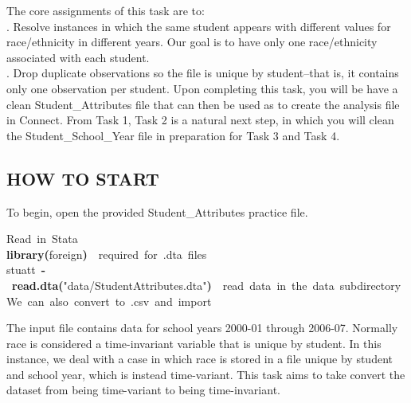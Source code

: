 \documentclass[12pt]{article}
\makeatletter
\newcommand{\hlfunctioncall}[1]{\textcolor[rgb]{0.501960784313725,0,0.329411764705882}{\textbf{#1}}}%
\newcommand{\hlstring}[1]{\textcolor[rgb]{0.6,0.6,1}{#1}}%
\newcommand{\hlkeyword}[1]{\textcolor[rgb]{0,0,0}{\textbf{#1}}}%
\newcommand{\hlcomment}[1]{\textcolor[rgb]{0.180392156862745,0.6,0.341176470588235}{#1}}%
\newcommand{\hlassignement}[1]{\textcolor[rgb]{0,0,0}{\textbf{#1}}}%
\newcommand{\hlsymbol}[1]{\textcolor[rgb]{0,0,0}{#1}}%
\newcommand{\hlstd}[1]{\textcolor[rgb]{0,0,0}{#1}}%
\newenvironment{kframe}{%
 \def\FrameCommand##1{\hskip\@totalleftmargin \hskip-\fboxsep
 \colorbox{shadecolor}{##1}\hskip-\fboxsep
     \hskip-\linewidth \hskip-\@totalleftmargin \hskip\columnwidth}%
 \MakeFramed {\advance\hsize-\width
   \@totalleftmargin\z@ \linewidth\hsize
   \@setminipage}}%
 {\par\unskip\endMakeFramed}
\makeatother
\begin{document}
The core assignments of this task are to: \\

. Resolve instances in which the same student appears with different values for race/ethnicity in different years. Our goal is to 
have only one race/ethnicity associated with each student.\\

. Drop duplicate observations so the file is unique by student--that is, it contains only one observation per student. Upon completing this task, you will be have a clean Student\_Attributes file that can then be used as to create the analysis file in Connect.  From Task 1, Task 2 is a natural next step, in which you will clean the Student\_School\_Year file in preparation for Task 3 and Task 4. \\

\subsection{HOW TO START}
\noindent To begin, open the provided Student\_Attributes practice file.

\begin{kframe}
\begin{flushleft}
\ttfamily\noindent
\hlcomment{\usebox{\hlnormalsizeboxhash}{\ }Read{\ }in{\ }Stata}\hspace*{\fill}\\
\hlstd{}\hlfunctioncall{library}\hlkeyword{(}\hlsymbol{foreign}\hlkeyword{)}{\ }{\ }\hlcomment{\usebox{\hlnormalsizeboxhash}{\ }required{\ }for{\ }.dta{\ }files}\hspace*{\fill}\\
\hlstd{}\hlsymbol{stuatt}{\ }\hlassignement{\usebox{\hlnormalsizeboxlessthan}-}{\ }\hlfunctioncall{read.dta}\hlkeyword{(}\hlstring{"{}data/Student\usebox{\hlnormalsizeboxunderscore}Attributes.dta"{}}\hlkeyword{)}{\ }{\ }\hlcomment{\usebox{\hlnormalsizeboxhash}{\ }read{\ }data{\ }in{\ }the{\ }data{\ }subdirectory}\hspace*{\fill}\\
\hlstd{}\hlcomment{\usebox{\hlnormalsizeboxhash}{\ }We{\ }can{\ }also{\ }convert{\ }to{\ }.csv{\ }and{\ }import}\mbox{}
\normalfont
\end{flushleft}
\end{kframe}


The input file contains data for school years 2000-01 through 2006-07.  Normally race is considered a time-invariant variable that is unique by 
student.  In this instance, we deal with a case in which race is stored in a file unique by student and school year, which is instead time-variant.  
This task aims to take convert the dataset from being time-variant to being time-invariant. \\
\end{document}
